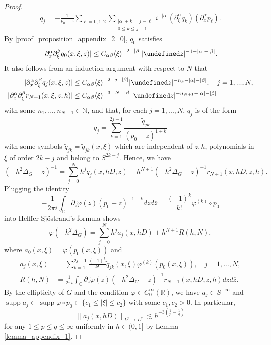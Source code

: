 \documentclass[10pt%
]{amsart}
\numberwithin{equation}{section}
\let\Im=\undefined\DeclareMathOperator*{\Im}{Im}
\newcommand{\R}{\mathbb{R}}
\newcommand{\C}{\mathbb{C}}
\theoremstyle{definition}
\def\<{{\langle}}
\def\>{{\rangle}}
\def\supp{\mathop{\mathrm{supp}}\nolimits}
\begin{document}
\begin{proof}
\begin{align*}
		q_j=-\frac{1}{p_0-z}\sum_{\ell=0,1,2}\sum_{\substack{|\alpha|+k=j-\ell\\0\le k\le j-1}} i^{-|\alpha|}(\partial_\xi^\alpha q_k)(\partial_x^\alpha p_\ell).%
	\end{align*}
	By \eqref{proof_proposition_appendix_2_0}, $q_0$ satisfies
	$$
	|\partial_x^\alpha\partial_\xi^\beta q_0(x,\xi,z)|\le C_{\alpha\beta}\<\xi\>^{-2-|\beta|}|\Im z|^{-1-|\alpha|-|\beta|}.
	$$
	It also follows from an induction argument with respect to $N$ that
	\begin{align}
		\nonumber
		|\partial_x^\alpha\partial_\xi^\beta q_j(x,\xi,z)|&\le C_{\alpha\beta}\<\xi\>^{-2-j-|\beta|}|\Im z|^{-n_k-|\alpha|-|\beta|},\quad j=1,...,N,\\
		\label{proof_proposition_appendix_2_1}
		|\partial_x^\alpha\partial_\xi^\beta r_{N+1}(x,\xi,z,h)|&\le C_{\alpha\beta}\<\xi\>^{-3-N-|\beta|}|\Im z|^{-n_{N+1}-|\alpha|-|\beta|}
	\end{align}
	with some $n_1,...,n_{N+1}\in \mathbb N$,  and that, for each $j=1,...,N$,  $q_j$ is of the form
	$$
	q_j=\sum_{k=1}^{2j-1}\frac{\widetilde q_{jk}}{(p_0-z)^{1+k}}
	$$
	with some symbols $\widetilde q_{jk}=\widetilde q_{jk}(x,\xi)$ which are independent of $z,h$, polynomials in $\xi$ of order $2k-j$ and belong to $S^{2k-j}$. Hence, we have
	$$
	(-h^2\Delta_G-z)^{-1}=\sum_{j=0}^Nh^jq_j(x,hD,z)-h^{N+1}(-h^2\Delta_G-z)^{-1}r_{N+1}(x,hD,z,h).
	$$
	Plugging the identity 
	$$
	-\frac{1}{2\pi i}\int_{\C}\partial_{\overline z}\widetilde\varphi(z)(p_0-z)^{-1-k}d z d\overline z=\frac{(-1)^k}{k!}\varphi^{(k)}\circ p_0
	$$
	into Helffer-Sj\"ostrand's formula shows
	$$
	\varphi(-h^2\Delta_G)=\sum_{j=0}^Nh^j a_j(x,hD)+h^{N+1}R(h,N),
	$$
	where $a_0(x,\xi)=\varphi(p_0(x,\xi))$ and
	\begin{align*}
		a_j(x,\xi)&=\sum_{k=1}^{2j-1}\frac{(-1)^k}{k!}\widetilde q_{jk}(x,\xi)\varphi^{(k)}(p_0(x,\xi)),\quad j=1,...,N,\\
		R(h,N)&=\frac{1}{2\pi i}\int_{\C}\partial_{\overline z}\widetilde\varphi(z)(-h^2\Delta_G-z)^{-1} r_{N+1}(x,hD,z,h)d z d\overline z.
	\end{align*}
	By the ellipticity of $G$ and the condition $\varphi\in C_0^\infty(\R)$, we have $a_j\in S^{-\infty}$ and $\supp a_j\subset \supp \varphi\circ p_0\subset \{c_1\le |\xi|\le c_2\}$ with some $c_1,c_2>0$. In particular, 
	$$
	\|a_j(x,hD)\|_{L^p\to L^q}\lesssim h^{-3(\frac1p-\frac1q)}
	$$
	for any $1\le p\le q\le \infty$ uniformly in $h\in (0,1]$ by Lemma \ref{lemma_appendix_1}. 
	

\end{proof}
\end{document}
